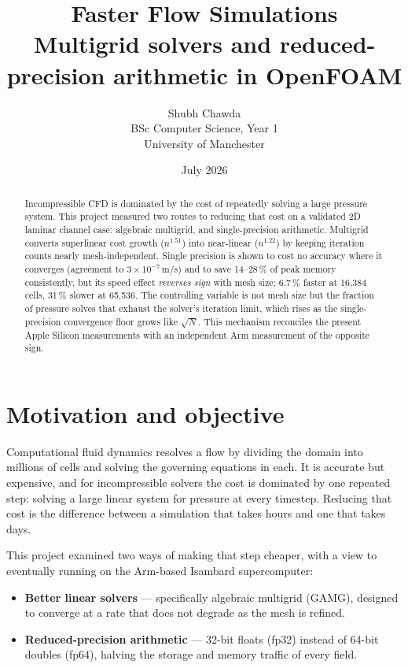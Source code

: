 \documentclass[10pt,twocolumn]{article}
\title{\vspace{-1.4em}\textbf{\Large Faster Flow Simulations}\\[0.25em]
\normalsize\normalfont Multigrid solvers and reduced-precision arithmetic in OpenFOAM}
\author{\normalsize Shubh Chawda\\[0.15em]
\small BSc Computer Science, Year 1\\
\small University of Manchester}
\date{\small July 2026}
\begin{document}
\maketitle

\begin{abstract}
\noindent\small
Incompressible CFD is dominated by the cost of repeatedly solving a large
pressure system. This project measured two routes to reducing that cost on a
validated 2D laminar channel case: algebraic multigrid, and single-precision
arithmetic. Multigrid converts superlinear cost growth ($n^{1.51}$) into
near-linear ($n^{1.22}$) by keeping iteration counts nearly mesh-independent.
Single precision is shown to cost no accuracy where it converges (agreement to
$3\times10^{-7}$\,m/s) and to save 14--28\,\% of peak memory consistently, but
its speed effect \emph{reverses sign} with mesh size: 6.7\,\% faster at 16{,}384
cells, 31\,\% slower at 65{,}536. The controlling variable is not mesh size but
the fraction of pressure solves that exhaust the solver's iteration limit, which
rises as the single-precision convergence floor grows like $\sqrt{N}$. This
mechanism reconciles the present Apple Silicon measurements with an independent
Arm measurement of the opposite sign.
\end{abstract}

\section{Motivation and objective}

Computational fluid dynamics resolves a flow by dividing the domain into
millions of cells and solving the governing equations in each. It is accurate
but expensive, and for incompressible solvers the cost is dominated by one
repeated step: solving a large linear system for pressure at every timestep.
Reducing that cost is the difference between a simulation that takes hours and
one that takes days.

This project examined two ways of making that step cheaper, with a view to
eventually running on the Arm-based Isambard supercomputer:

\begin{itemize}
  \item \textbf{Better linear solvers} --- specifically algebraic multigrid
  (GAMG), designed to converge at a rate that does not degrade as the mesh is
  refined.
  \item \textbf{Reduced-precision arithmetic} --- 32-bit floats (fp32) instead
  of 64-bit doubles (fp64), halving the storage and memory traffic of every
  field.
\end{itemize}
\end{document}
